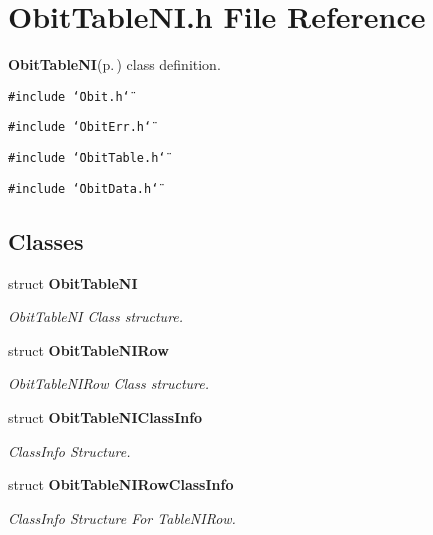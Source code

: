 \section{Obit\-Table\-NI.h File Reference}
\label{ObitTableNI_8h}
{\bf Obit\-Table\-NI}{\rm (p.\,\pageref{structObitTableNI})} class definition. 

{\tt \#include \char`\"{}Obit.h\char`\"{}}\par
{\tt \#include \char`\"{}Obit\-Err.h\char`\"{}}\par
{\tt \#include \char`\"{}Obit\-Table.h\char`\"{}}\par
{\tt \#include \char`\"{}Obit\-Data.h\char`\"{}}\par
\subsection*{Classes}
\begin{CompactItemize}
\item 
struct {\bf Obit\-Table\-NI}
\begin{CompactList}\small\item\em Obit\-Table\-NI Class structure. \item\end{CompactList}\item 
struct {\bf Obit\-Table\-NIRow}
\begin{CompactList}\small\item\em Obit\-Table\-NIRow Class structure. \item\end{CompactList}\item 
struct {\bf Obit\-Table\-NIClass\-Info}
\begin{CompactList}\small\item\em Class\-Info Structure. \item\end{CompactList}\item 
struct {\bf Obit\-Table\-NIRow\-Class\-Info}
\begin{CompactList}\small\item\em Class\-Info Structure For Table\-NIRow. \item\end{CompactList}\end{CompactItemize}

